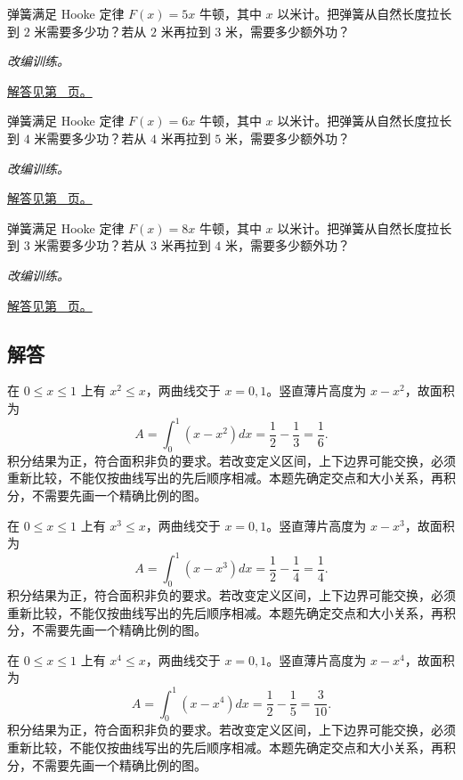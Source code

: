 \documentclass[UTF8,12pt,a4paper,fontset=fandol]{ctexart}
\begin{document}
\begin{example}[变力做功]\label{ex:c21q22}
弹簧满足 Hooke 定律 $F(x)=5x$ 牛顿，其中 $x$ 以米计。把弹簧从自然长度拉长到 $2$ 米需要多少功？若从 $2$ 米再拉到 $3$ 米，需要多少额外功？
\par\textit{改编训练。}\par\hyperref[ans:c21q22]{解答见第~\pageref{ans:c21q22} 页。}
\end{example}
\begin{example}[变力做功]\label{ex:c21q23}
弹簧满足 Hooke 定律 $F(x)=6x$ 牛顿，其中 $x$ 以米计。把弹簧从自然长度拉长到 $4$ 米需要多少功？若从 $4$ 米再拉到 $5$ 米，需要多少额外功？
\par\textit{改编训练。}\par\hyperref[ans:c21q23]{解答见第~\pageref{ans:c21q23} 页。}
\end{example}
\begin{example}[变力做功]\label{ex:c21q24}
弹簧满足 Hooke 定律 $F(x)=8x$ 牛顿，其中 $x$ 以米计。把弹簧从自然长度拉长到 $3$ 米需要多少功？若从 $3$ 米再拉到 $4$ 米，需要多少额外功？
\par\textit{改编训练。}\par\hyperref[ans:c21q24]{解答见第~\pageref{ans:c21q24} 页。}
\end{example}
\subsection{解答}
\begin{solve}\label{ans:c21q1}
在 $0\le x\le1$ 上有 $x^{2}\le x$，两曲线交于 $x=0,1$。竖直薄片高度为 $x-x^{2}$，故面积为
\[
A=\int_0^1(x-x^{2})dx=\frac12-\frac1{3}=\frac{1}{6}.
\]
积分结果为正，符合面积非负的要求。若改变定义区间，上下边界可能交换，必须重新比较，不能仅按曲线写出的先后顺序相减。本题先确定交点和大小关系，再积分，不需要先画一个精确比例的图。
\end{solve}

\begin{solve}\label{ans:c21q2}
在 $0\le x\le1$ 上有 $x^{3}\le x$，两曲线交于 $x=0,1$。竖直薄片高度为 $x-x^{3}$，故面积为
\[
A=\int_0^1(x-x^{3})dx=\frac12-\frac1{4}=\frac{1}{4}.
\]
积分结果为正，符合面积非负的要求。若改变定义区间，上下边界可能交换，必须重新比较，不能仅按曲线写出的先后顺序相减。本题先确定交点和大小关系，再积分，不需要先画一个精确比例的图。
\end{solve}

\begin{solve}\label{ans:c21q3}
在 $0\le x\le1$ 上有 $x^{4}\le x$，两曲线交于 $x=0,1$。竖直薄片高度为 $x-x^{4}$，故面积为
\[
A=\int_0^1(x-x^{4})dx=\frac12-\frac1{5}=\frac{3}{10}.
\]
积分结果为正，符合面积非负的要求。若改变定义区间，上下边界可能交换，必须重新比较，不能仅按曲线写出的先后顺序相减。本题先确定交点和大小关系，再积分，不需要先画一个精确比例的图。
\end{solve}
\end{document}
